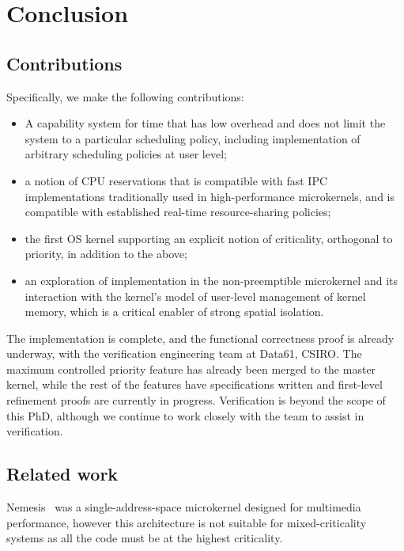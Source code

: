 \chapter{Conclusion}
\label{chap:conclusion}


\section{Contributions}

Specifically, we make the following contributions:
\begin{itemize}
\item A capability system for time that has low overhead and does not
  limit the system to a particular scheduling policy, including
  implementation of arbitrary scheduling policies at user level;
\item a notion of CPU reservations that is compatible with
  fast IPC implementations traditionally used in high-performance
  microkernels, and is compatible with established real-time resource-sharing policies;
\item the first OS kernel supporting an explicit notion of
  criticality, orthogonal to priority, in addition to the above;
\item an exploration of implementation in the non-preemptible \selfour
  microkernel and its interaction with the kernel's model of
  user-level management of kernel memory, which is a critical enabler
  of strong spatial isolation.
\end{itemize}

The implementation is complete, and the functional correctness proof is already underway, with the
verification engineering team at Data61, CSIRO. The maximum controlled
priority feature has already been merged to the master kernel, while the rest of the features have
specifications written and first-level refinement proofs are currently in progress. Verification is
beyond the scope of this PhD, although we continue to work closely with the team to assist in
verification. 

\section{Related work}

Nemesis~\citep{Leslie_MBRBEFH_96} was a single-address-space microkernel designed for multimedia
performance, however this architecture is not suitable for mixed-criticality systems as all the
code must be at the highest criticality.

